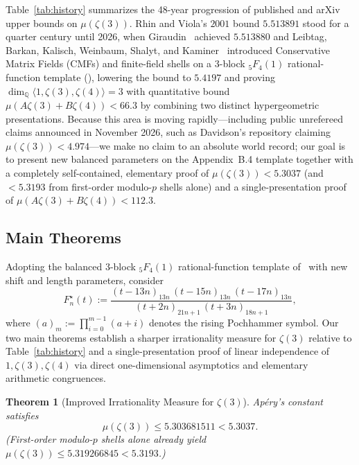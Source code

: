 \documentclass[11pt,reqno]{amsart}
\newtheorem{theorem}{Theorem}[section]
\theoremstyle{definition}
\theoremstyle{remark}
\newcommand{\QQ}{\mathbb{Q}}
\begin{document}
Table~\ref{tab:history} summarizes the 48-year progression of published and arXiv upper bounds on $\mu(\zeta(3))$. Rhin and Viola's $2001$ bound $5.513891$ stood for a quarter century until 2026, when Giraudin~\cite{Giraudin2026} achieved $5.513880$ and Leibtag, Barkan, Kalisch, Weinbaum, Shalyt, and Kaminer~\cite{LeibtagKaminer2026} introduced Conservative Matrix Fields (CMFs) and finite-field shells on a $3$-block ${}_5F_4(1)$ rational-function template (\cite[Appendix~B.4]{LeibtagKaminer2026}), lowering the bound to $5.4197$ and proving $\dim_{\QQ}\langle 1, \zeta(3), \zeta(4) \rangle = 3$ with quantitative bound $\mu(A\zeta(3) + B\zeta(4)) < 66.3$ by combining two distinct hypergeometric presentations. Because this area is moving rapidly—including public unrefereed claims announced in November 2026, such as Davidson's repository claiming $\mu(\zeta(3)) < 4.974$—we make no claim to an absolute world record; our goal is to present new balanced parameters on the Appendix~B.4 template together with a completely self-contained, elementary proof of $\mu(\zeta(3)) < 5.3037$ (and $< 5.3193$ from first-order modulo-$p$ shells alone) and a single-presentation proof of $\mu(A\zeta(3) + B\zeta(4)) < 112.3$.

\subsection{Main Theorems}
Adopting the balanced $3$-block ${}_5F_4(1)$ rational-function template of~\cite[Appendix~B.4]{LeibtagKaminer2026} with new shift and length parameters, consider
\begin{equation}
\label{eq:Fnstar}
  F_n^{\star}(t)
  := \frac{(t - 13n)_{13n}\,(t - 15n)_{13n}\,(t - 17n)_{13n}}
          {(t + 2n)_{21n + 1}\,(t + 3n)_{18n + 1}},
\end{equation}
where $(a)_m := \prod_{i=0}^{m-1}(a + i)$ denotes the rising Pochhammer symbol. Our two main theorems establish a sharper irrationality measure for $\zeta(3)$ relative to Table~\ref{tab:history} and a single-presentation proof of linear independence of $1, \zeta(3), \zeta(4)$ via direct one-dimensional asymptotics and elementary arithmetic congruences.

\begin{theorem}[Improved Irrationality Measure for $\zeta(3)$]
\label{thm:main-zeta3}
Ap{\'e}ry's constant satisfies
\[
  \mu(\zeta(3)) \le 5.303681511 < 5.3037.
\]
(First-order modulo-$p$ shells alone already yield $\mu(\zeta(3)) \le 5.319266845 < 5.3193$.)
\end{theorem}
\end{document}
